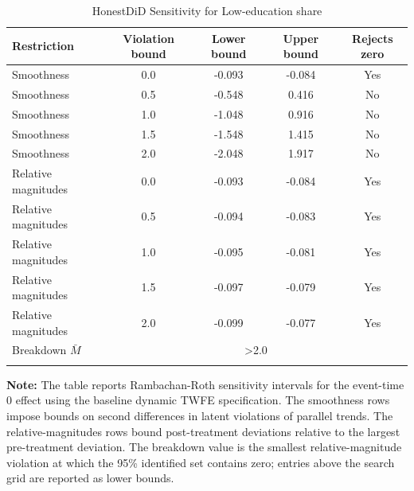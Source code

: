 \begin{table}[htbp]
    \caption{HonestDiD Sensitivity for Low-education share}
    \label{tab:honestdid-pct_voters_low_ed}
    \centering
    \small
    \renewcommand{\arraystretch}{1.08}
    \begin{tabular*}{0.94\textwidth}{@{\extracolsep{\fill}}lcccc}
        \doubletoprule
        Restriction & Violation bound & Lower bound & Upper bound & Rejects zero \\
        \midrule
        Smoothness & 0.0 & -0.093 & -0.084 & Yes \\
        Smoothness & 0.5 & -0.548 & 0.416 & No \\
        Smoothness & 1.0 & -1.048 & 0.916 & No \\
        Smoothness & 1.5 & -1.548 & 1.415 & No \\
        Smoothness & 2.0 & -2.048 & 1.917 & No \\
        \midrule
        Relative magnitudes & 0.0 & -0.093 & -0.084 & Yes \\
        Relative magnitudes & 0.5 & -0.094 & -0.083 & Yes \\
        Relative magnitudes & 1.0 & -0.095 & -0.081 & Yes \\
        Relative magnitudes & 1.5 & -0.097 & -0.079 & Yes \\
        Relative magnitudes & 2.0 & -0.099 & -0.077 & Yes \\
        \midrule
        Breakdown $\bar{M}$ & \multicolumn{4}{c}{>2.0} \\
        \doublebottomrule
    \end{tabular*}
    \vspace{1.0em}
    \begin{minipage}{0.94\textwidth}
        {\footnotesize \textbf{Note:} The table reports Rambachan-Roth sensitivity intervals for the event-time $0$ effect using the baseline dynamic TWFE specification. The smoothness rows impose bounds on second differences in latent violations of parallel trends. The relative-magnitudes rows bound post-treatment deviations relative to the largest pre-treatment deviation. The breakdown value is the smallest relative-magnitude violation at which the 95\% identified set contains zero; entries above the search grid are reported as lower bounds. \par}
    \end{minipage}
\end{table}
